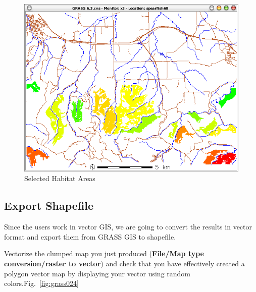 \begin{figure}[htbp]
   \centering
   \includegraphics[scale=0.35]{grass023.png}
   \caption{Selected Habitat Areas}
   \label{fig:grass023}
\end{figure}

\subsection{Export Shapefile}
Since the users work in vector GIS, we are going to convert the results in vector format and export them from GRASS GIS to shapefile.

Vectorize the clumped map you just produced (\textbf{File/Map type conversion/raster to vector}) and check that you have effectively created a polygon vector map by displaying your vector using random colors.Fig.~\ref{fig:grass024}

